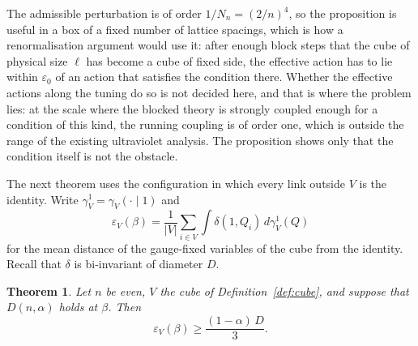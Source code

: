 \documentclass[11pt]{amsart}
\newtheorem{theorem}{Theorem}[section]
\theoremstyle{definition}
\theoremstyle{remark}
\numberwithin{equation}{section}
\begin{document}
The admissible perturbation is of order $1/N_n=(2/n)^4$, so the proposition
is useful in a box of a fixed number of lattice spacings, which is how a
renormalisation argument would use it: after enough block steps that the
cube of physical size $\ell$ has become a cube of fixed side, the effective
action has to lie within $\varepsilon_0$ of an action that satisfies the
condition there. Whether the effective actions along the tuning do so is
not decided here, and that is where the problem lies: at the scale where
the blocked theory is strongly coupled enough for a condition of this kind,
the running coupling is of order one, which is outside the range of the
existing ultraviolet analysis. The proposition shows only that the
condition itself is not the obstacle.

The next theorem uses the configuration in which every link outside $V$ is
the identity. Write $\gamma^1_V=\gamma_V(\cdot\mid1)$ and
\[
\varepsilon_V(\beta)=\frac1{|V|}\sum_{i\in V}\int\delta(1,Q_i)\,
d\gamma^1_V(Q)
\]
for the mean distance of the gauge-fixed variables of the cube from the
identity. Recall that $\delta$ is bi-invariant of diameter $D$.

\begin{theorem}\label{thm:cubeneeds}
Let $n$ be even, $V$ the cube of Definition~\ref{def:cube}, and suppose that
$D(n,\alpha)$ holds at $\beta$. Then
\[
\varepsilon_V(\beta)\ge\frac{(1-\alpha)\,D}3 .
\]
\end{theorem}
\end{document}

